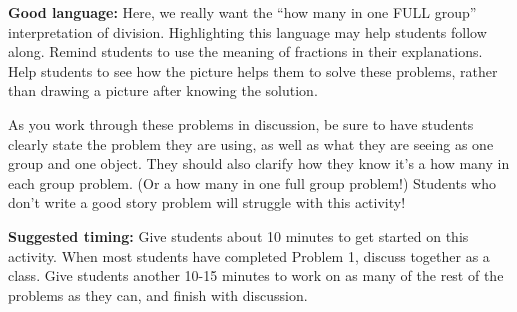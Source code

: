 \documentclass[nooutcomes,noauthor]{ximera}
\begin{document}
\begin{instructorNotes}
{\bf Good language:}  Here, we really want the ``how many in one FULL group'' interpretation of division. Highlighting this language may help students follow along.  Remind students to use the meaning of fractions in their explanations. Help students to see how the picture helps them to solve these problems, rather than drawing a picture after knowing the solution.

As you work through these problems in discussion, be sure to have students clearly state the problem they are using, as well as what they are seeing as one group and one object. They should also clarify how they know it's a how many in each group problem. (Or a how many in one full group problem!) Students who don't write a good story problem will struggle with this activity!



{\bf Suggested timing:} Give students about 10 minutes to get started on this activity. When most students have completed Problem 1, discuss together as a class. Give students another 10-15 minutes to work on as many of the rest of the problems as they can, and finish with discussion.

\end{instructorNotes}
\end{document}
